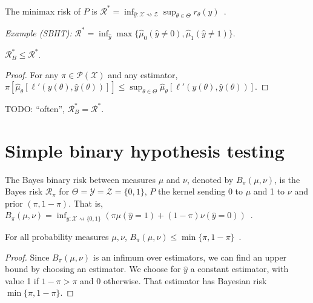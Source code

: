 \begin{definition}
  \label{def:minimaxRisk}
  The minimax risk of $P$ is $\mathcal R^* = \inf_{\hat{y} : \mathcal X \rightsquigarrow \mathcal Z} \sup_{\theta \in \Theta} r_\theta(\hat{y})$~.
\end{definition}

\emph{Example (SBHT):} $\mathcal R^* = \inf_{\hat{y}} \max\{\hat{\mu}_0(\hat{y} \ne 0), \hat{\mu}_1(\hat{y} \ne 1)\}$.

\begin{lemma}
  \label{lem:bayesRisk_le_minimaxRisk}
  $\mathcal R_B^* \le \mathcal R^*$.
\end{lemma}

\begin{proof}
For any $\pi \in \mathcal P(\mathcal X)$ and any estimator, $\pi\left[\hat{\mu}_\theta\left[\ell'(y(\theta), \hat{y}(\theta))\right]\right] \le \sup_{\theta \in \Theta}\hat{\mu}_\theta\left[\ell'(y(\theta), \hat{y}(\theta))\right]$.
\end{proof}

TODO: ``often'', $\mathcal R^*_B = \mathcal R^*$.

\section{Simple binary hypothesis testing}

\begin{definition}
  \label{def:bayesBinaryRisk}
  The Bayes binary risk between measures $\mu$ and $\nu$, denoted by $B_\pi(\mu, \nu)$, is the Bayes risk $\mathcal R_\pi$ for $\Theta = \mathcal Y = \mathcal Z = \{0,1\}$, $P$ the kernel sending 0 to $\mu$ and 1 to $\nu$ and prior $(\pi, 1-\pi)$.
  That is, $B_\pi(\mu, \nu) = \inf_{\hat{y} : \mathcal X \rightsquigarrow \{0,1\}}\left(\pi \mu(\hat{y} = 1) + (1 - \pi) \nu(\hat{y} = 0)\right)$~.
\end{definition}

\begin{lemma}
  \label{lem:bayesBinaryRisk_le}
  For all probability measures $\mu, \nu$, $B_\pi(\mu, \nu) \le \min\{\pi, 1 - \pi\}$~.
\end{lemma}

\begin{proof}%
{}
Since $B_\pi(\mu, \nu)$ is an infimum over estimators, we can find an upper bound by choosing an estimator. We choose for $\hat{y}$ a constant estimator, with value 1 if $1- \pi > \pi$ and 0 otherwise.
That estimator has Bayesian risk $\min\{\pi, 1 - \pi\}$.
\end{proof}

